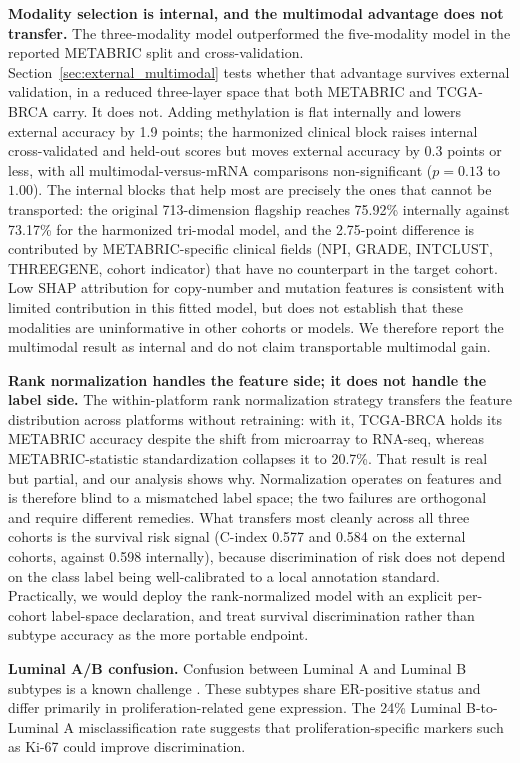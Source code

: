 \documentclass[11pt,a4paper]{article}
\begin{document}
\textbf{Modality selection is internal, and the multimodal advantage does not transfer.} The
three-modality model outperformed the five-modality model in the reported METABRIC split and
cross-validation. Section~\ref{sec:external_multimodal} tests whether that advantage survives
external validation, in a reduced three-layer space that both METABRIC and TCGA-BRCA carry.
It does not. Adding methylation is flat internally and lowers external accuracy by 1.9 points;
the harmonized clinical block raises internal cross-validated and held-out scores but moves
external accuracy by 0.3 points or less, with all multimodal-versus-mRNA comparisons
non-significant ($p = 0.13$ to $1.00$). The internal blocks that help most are precisely the
ones that cannot be transported: the original 713-dimension flagship reaches 75.92\% internally
against 73.17\% for the harmonized tri-modal model, and the 2.75-point difference is
contributed by METABRIC-specific clinical fields (NPI, GRADE, INTCLUST, THREEGENE, cohort
indicator) that have no counterpart in the target cohort. Low SHAP attribution for copy-number
and mutation features is consistent with limited contribution in this fitted model, but does
not establish that these modalities are uninformative in other cohorts or models. We therefore
report the multimodal result as internal and do not claim transportable multimodal gain.

\textbf{Rank normalization handles the feature side; it does not handle the label side.} The
within-platform rank normalization strategy transfers the feature distribution across platforms
without retraining: with it, TCGA-BRCA holds its METABRIC accuracy despite the shift from
microarray to RNA-seq, whereas METABRIC-statistic standardization collapses it to 20.7\%. That
result is real but partial, and our analysis shows why. Normalization operates on features and is
therefore blind to a mismatched label space; the two failures are orthogonal and require
different remedies. What transfers most cleanly across all three cohorts is the survival risk
signal (C-index 0.577 and 0.584 on the external cohorts, against 0.598 internally), because
discrimination of risk does not depend on the class label being well-calibrated to a local
annotation standard. Practically, we would deploy the rank-normalized model with an explicit
per-cohort label-space declaration, and treat survival discrimination rather than subtype
accuracy as the more portable endpoint.

\textbf{Luminal A/B confusion.} Confusion between Luminal A and Luminal B subtypes is a known challenge \citep{bastien2012pam50}. These subtypes share ER-positive status and differ primarily in proliferation-related gene expression. The 24\% Luminal B-to-Luminal A misclassification rate suggests that proliferation-specific markers such as Ki-67 could improve discrimination.
\end{document}
